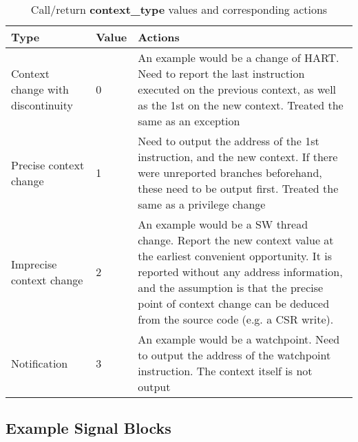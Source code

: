 \begin{table}[htp]
    \centering
    \caption{Call/return \textbf{context\_type} values and corresponding actions}
    \label{tab:context-type}
    \begin{tabulary}{\textwidth}{|l|l|p{80mm}|}
        \hline
        \textbf {Type} & \textbf {Value} & \textbf {Actions} \\
        \hline
        Context change with discontinuity & 0 &  An example would be a change of HART.\newline
        Need to report the last instruction executed on the previous context, as well as the 1st on the new context.\newline
        Treated the same as an exception\\
        \hline
        Precise context change & 1 & Need to output the address of the 1st instruction, and the new context.\newline
        If there were unreported branches beforehand, these need to be output first.\newline
        Treated the same as a privilege change\\
        \hline
        Imprecise context change & 2 & An example would be a SW thread change.\newline
        Report the new context value at the earliest convenient opportunity.\newline
        It is reported without any address information, and the assumption is that the precise point of context change can be deduced from the source code (e.g. a CSR write). \\
        \hline
        Notification & 3 & An example would be a watchpoint.\newline
        Need to output the address of the watchpoint instruction.\newline
        The context itself is not output\\
        \hline
    \end{tabulary}
\end{table}

\subsection {Example Signal Blocks}

